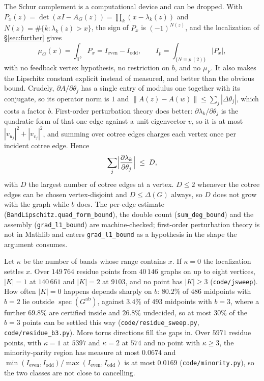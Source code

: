 \documentclass[11pt]{article}
\theoremstyle{remark}
\begin{document}
The Schur complement is a computational device and can be dropped. With
$P_x(z)=\det(xI-A_G(z))=\prod_k(x-\lambda_k(z))$ and $N(z)=\#\{k:\lambda_k(z)>x\}$, the sign
of $P_x$ is $(-1)^{N(z)}$, and the localization of \S\ref{sec:further} gives
\[
   \mu_G(x)=\int_{\mathbb T^b}P_x
   =I_{\mathrm{even}}-I_{\mathrm{odd}},\qquad
   I_p=\int_{\{N\equiv p\ (2)\}}|P_x| ,
\]
with no feedback vertex hypothesis, no restriction on $b$, and no $\mu_F$. It also makes the
Lipschitz constant explicit instead of measured, and better than the obvious bound. Crudely,
$\partial A/\partial\theta_j$ has a single entry of modulus one together with its conjugate,
so its operator norm is $1$ and $\|A(z)-A(w)\|\le\sum_j|\Delta\theta_j|$, which costs a factor
$b$. First-order perturbation theory does better: $\partial\lambda_k/\partial\theta_j$ is the
quadratic form of that one edge against a unit eigenvector $v$, so it is at most
$|v_{u_j}|^2+|v_{v_j}|^2$, and summing over cotree edges charges each vertex once per incident
cotree edge. Hence
\[
   \sum_j\Bigl|\frac{\partial\lambda_k}{\partial\theta_j}\Bigr|\;\le\;D ,
\]
with $D$ the largest number of cotree edges at a vertex. $D\le2$ whenever the cotree edges can
be chosen vertex-disjoint and $D\le\Delta(G)$ always, so $D$ does not grow with the graph while
$b$ does. The per-edge estimate (\texttt{BandLipschitz.quad\_form\_bound}), the double count
(\texttt{sum\_deg\_bound}) and the assembly (\texttt{grad\_l1\_bound}) are machine-checked;
first-order perturbation theory is not in Mathlib and enters \texttt{grad\_l1\_bound} as a
hypothesis in the shape the argument consumes.

Let $\kappa$ be the number of bands whose range contains $x$. If $\kappa=0$ the localization
settles $x$. Over $149\,764$ residue points from $40\,146$ graphs on up to eight vertices,
$|K|=1$ at $140\,661$ and $|K|=2$ at $9103$, and no point has $|K|\ge3$
(\texttt{code/jsweep}). How often $|K|=0$ happens depends sharply on $b$: $80.2\%$ of $486$
midpoints
with $b=2$ lie outside $\operatorname{spec}(G^{\mathrm{ab}})$, against $3.4\%$ of $493$
midpoints with $b=3$, where a further $69.8\%$ are certified inside and $26.8\%$ undecided,
so at most $30\%$ of the $b=3$ points can be settled this way
(\texttt{code/residue\_sweep.py}, \texttt{code/residue\_b3.py}). More torus directions fill
the gaps in. Over $5971$ residue points, with $\kappa=1$ at $5397$ and $\kappa=2$ at $574$
and no point with $\kappa\ge3$, the minority-parity region has measure at most
$0.0674$ and
$\min(I_{\mathrm{even}},I_{\mathrm{odd}})/\max(I_{\mathrm{even}},I_{\mathrm{odd}})$ is at
most $0.0169$ (\texttt{code/minority.py}), so the two classes are not close to cancelling.
\end{document}
